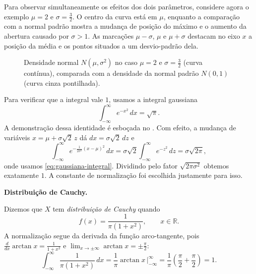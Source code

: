 \documentclass[12pt,portuguese]{article}
\theoremstyle{definition}
\theoremstyle{plainexercise}
\theoremstyle{starredexercise}
\theoremstyle{definition}
\begin{document}
Para observar simultaneamente os efeitos dos dois parâmetros, considere agora
o exemplo $\mu=2$ e $\sigma=\tfrac{3}{2}$. O centro da curva está em $\mu$,
enquanto a comparação com a normal padrão mostra a mudança de posição do
máximo e o aumento da abertura causado por $\sigma>1$. As marcações
$\mu-\sigma$, $\mu$ e $\mu+\sigma$ destacam no eixo $x$ a posição da média
e os pontos situados a um desvio-padrão dela.

\begin{figure}[H]
\centering
{}
\caption{Densidade normal $N(\mu,\sigma^2)$ no caso
$\mu=2$ e $\sigma=\tfrac{3}{2}$ (curva contínua), comparada com a densidade
da normal padrão $N(0,1)$ (curva cinza pontilhada).}
\label{fig:densidade-normal-parametros}
\end{figure}

Para verificar que a integral vale $1$, usamos a integral gaussiana
\begin{equation}
  \int_{-\infty}^{\infty} e^{-x^2}\,dx = \sqrt{\pi}.
  \label{eq:gaussiana-integral}
\end{equation}
A demonstração dessa identidade é esboçada no . Com efeito, a mudança de variáveis $x = \mu + \sigma\sqrt{2}\,z$ dá
$dx = \sigma\sqrt{2}\,dz$ e
\[
  \int_{-\infty}^{\infty} e^{-\frac{1}{2\sigma^2}(x-\mu)^2}\,dx
  = \sigma\sqrt{2}\int_{-\infty}^{\infty} e^{-z^2}\,dz
  = \sigma\sqrt{2\pi},
\]
onde usamos \eqref{eq:gaussiana-integral}. Dividindo pelo fator
$\sqrt{2\pi\sigma^2}$ obtemos exatamente $1$. A constante de normalização
foi escolhida justamente para isso.

\medskip
\noindent\textbf{Distribuição de Cauchy.}

Dizemos que $X$ tem \emph{distribuição de Cauchy} quando
\begin{equation}
  f(x) = \frac{1}{\pi(1+x^2)}, \qquad x \in \mathbb{R}.
  \label{eq:dens-cauchy}
\end{equation}
A normalização segue da derivada da função arco-tangente, pois
$\frac{d}{dx}\arctan x = \frac{1}{1+x^2}$ e
$\lim_{x\to\pm\infty}\arctan x = \pm\frac{\pi}{2}$:
\[
  \int_{-\infty}^{\infty} \frac{1}{\pi(1+x^2)}\,dx
  = \frac{1}{\pi} \arctan x\,\Big|_{-\infty}^{\infty}
  = \frac{1}{\pi}\left(\frac{\pi}{2}+\frac{\pi}{2}\right) = 1.
\]
\end{document}
